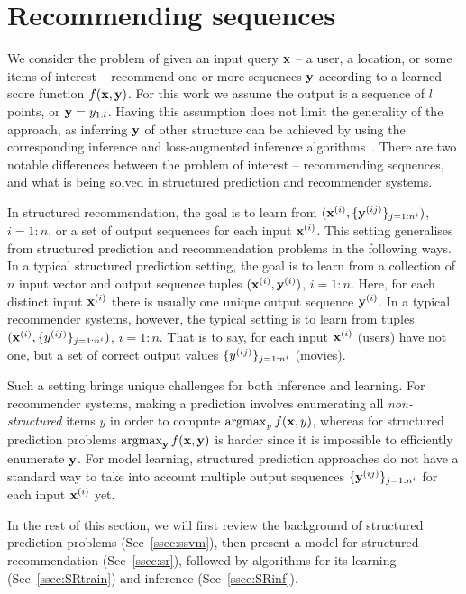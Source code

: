 \section{Recommending sequences}
\label{sec:recseq}

We consider the problem of given an input query $\mathbf{x}$ -- a user, a location, or some items of interest -- 
recommend one or more sequences $\mathbf{y}$ according to a learned score function $f(\mathbf{x},\mathbf{y})$. 
For this work we assume the output is a sequence of $l$ points, or $\mathbf{y}=y_{1:l}$. 
Having this assumption does not limit the generality of the approach, 
as inferring $\mathbf{y}$ of other structure can be achieved by using the corresponding inference and loss-augmented inference algorithms~\cite{joachims2009predicting}.  %
There are two notable differences between the problem of interest -- recommending sequences, and what is being solved 
in structured prediction and recommender systems. 

In structured recommendation, the goal is to learn from 
$(\mathbf{x}^{({i})}, \{ \mathbf{y}^{({ij})} \}_{j=1:n^i})$, $i=1:n$, or a set of output sequences for each input $\mathbf{x}^{({i})}$. 
This setting generalises from structured prediction and recommendation problems in the following ways. 
In a typical structured prediction setting, the goal is to learn from a collection of $n$
input vector and output sequence tuples $(\mathbf{x}^{({i})}, \mathbf{y}^{({i})})$, $i=1:n$. Here, 
for each distinct input $\mathbf{x}^{({i})}$ there is usually one unique output sequence $\mathbf{y}^{({i})}$. 
In a typical recommender systems, however, the typical setting is to learn from 
tuples $(\mathbf{x}^{({i})}, \{ y^{({ij})} \}_{j=1:n^i})$, $i=1:n$. That is to say, for each input $\mathbf{x}^{({i})}$ (\eg users)
have not one, but a set of correct output values $\{ y^{({ij})} \}_{j=1:n^i}$ (\eg movies). 

Such a setting brings unique challenges for both inference and learning. 
For recommender systems, making a prediction involves enumerating all {\em non-structured} items $y$ in order to compute $\operatorname*{argmax}_y f(\mathbf{x},y)$, whereas for structured prediction problems $\operatorname*{argmax}_{\mathbf{y}} f(\mathbf{x},\mathbf{y})$ is harder since it is impossible to efficiently enumerate $\mathbf{y}$. For model learning, structured prediction approaches do not have a standard way to take into account multiple output sequences $\{ \mathbf{y}^{({ij})} \}_{j=1:n^i}$ for each input $\mathbf{x}^{({i})}$ yet. 

In the rest of this section, we will first review the background of structured prediction problems (Sec~\ref{ssec:ssvm}), then present a model for structured recommendation (Sec~\ref{ssec:sr}), followed by algorithms for its learning (Sec~\ref{ssec:SRtrain}) and inference (Sec~\ref{ssec:SRinf}).

